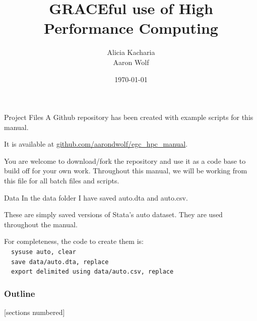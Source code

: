 \documentclass[10pt,xcolor={svgnames}]{beamer}
\title{GRACEful use of High Performance Computing}
\author{Alicia Kacharia \\ Aaron Wolf}
\date{\today}
\begin{document}
\maketitle

\begin{frame}{Project Files}
A Github repository has been created with example scripts for this manual. \newline


It is available at \href{https://github.com/aarondwolf/egc_hpc_manual}{github.com/aarondwolf/egc\_hpc\_manual}. \newline


You are welcome to download/fork the repository and use it as a code base to build off for your own work. Throughout this manual, we will be working from this file for all batch files and scripts.
\end{frame}

\begin{frame}{Data}
In the data folder I have saved auto.dta and auto.csv.


These are simply saved versions of Stata's auto dataset. They are used throughout the manual.

For completeness, the code to create them is:\\
~~\texttt{sysuse auto, clear} \\
~~\texttt{save data/auto.dta, replace} \\
~~\texttt{export delimited using data/auto.csv, replace} \\

\end{frame}


\begin{frame}
    \frametitle{Outline}
    [sections numbered]
    \begin{columns}[t]
        \begin{column}{.5\textwidth}
            \tableofcontents[sections={1-7}]
        \end{column}
        \begin{column}{.5\textwidth}
            \tableofcontents[sections={8-11}]
        \end{column}
    \end{columns}
\end{frame}
\end{document}
